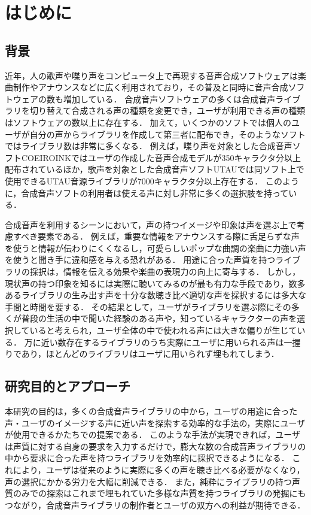 \chapter{はじめに}
\thispagestyle{myheadings}

\section{背景}
\label{sec:background}

近年，人の歌声や喋り声をコンピュータ上で再現する音声合成ソフトウェアは楽曲制作やアナウンスなどに広く利用されており，その普及と同時に音声合成ソフトウェアの数も増加している．
合成音声ソフトウェアの多くは合成音声ライブラリを切り替えて合成される声の種類を変更でき，ユーザが利用できる声の種類はソフトウェアの数以上に存在する．
加えて，いくつかのソフトでは個人のユーザが自分の声からライブラリを作成して第三者に配布でき，そのようなソフトではライブラリ数は非常に多くなる．
例えば，喋り声を対象とした合成音声ソフトCOEIROINKではユーザの作成した音声合成モデルが350キャラクタ分以上配布されているほか\cite{mycoeiroink}，歌声を対象とした合成音声ソフトUTAUでは同ソフト上で使用できるUTAU音源ライブラリが7000キャラクタ分以上存在する\cite{vdbutau}．
このように，合成音声ソフトの利用者は使える声に対し非常に多くの選択肢を持っている．

合成音声を利用するシーンにおいて，声の持つイメージや印象は声を選ぶ上で考慮すべき要素である．
例えば，重要な情報をアナウンスする際に舌足らずな声を使うと情報が伝わりにくくなるし，可愛らしいポップな曲調の楽曲に力強い声を使うと聞き手に違和感を与える恐れがある．
用途に合った声質を持つライブラリの採択は，情報を伝える効果や楽曲の表現力の向上に寄与する．
しかし，現状声の持つ印象を知るには実際に聴いてみるのが最も有力な手段であり，数多あるライブラリの生み出す声を十分な数聴き比べ適切な声を採択するには多大な手間と時間を要する．
その結果として，ユーザがライブラリを選ぶ際にその多くが普段の生活の中で聞いた経験のある声や，知っているキャラクターの声を選択していると考えられ，ユーザ全体の中で使われる声には大きな偏りが生じている．
万に近い数存在するライブラリのうち実際にユーザに用いられる声は一握りであり，ほとんどのライブラリはユーザに用いられず埋もれてしまう．

\section{研究目的とアプローチ}
本研究の目的は，多くの合成音声ライブラリの中から，ユーザの用途に合った声・ユーザのイメージする声に近い声を探索する効率的な手法の，実際にユーザが使用できるかたちでの提案である．
このような手法が実現できれば，ユーザは声質に対する自身の要求を入力するだけで，膨大な数の合成音声ライブラリの中から要求に合った声を持つライブラリを効率的に採択できるようになる．
これにより，ユーザは従来のように実際に多くの声を聴き比べる必要がなくなり，声の選択にかかる労力を大幅に削減できる．
また，純粋にライブラリの持つ声質のみでの探索はこれまで埋もれていた多様な声質を持つライブラリの発掘にもつながり，合成音声ライブラリの制作者とユーザの双方への利益が期待できる．

